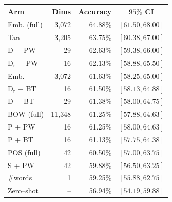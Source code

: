 \begin{tabular}{@{}l r r c@{}}
\toprule
Arm & Dims & Accuracy & $95\%$ CI \\
\midrule
Emb. (full)            & 3{,}072  & 64.88\% & $[61.50, 68.00]$ \\
Tan                    & 3{,}205  & 63.75\% & $[60.38, 67.00]$ \\
D + PW                 & 29       & 62.63\% & $[59.38, 66.00]$ \\
D$_{\mathrm{r}}$ + PW  & 16       & 62.13\% & $[58.88, 65.50]$ \\
Emb.                   & 3{,}072  & 61.63\% & $[58.25, 65.00]$ \\
D$_{\mathrm{r}}$ + BT  & 16       & 61.50\% & $[58.13, 64.88]$ \\
D + BT                 & 29       & 61.38\% & $[58.00, 64.75]$ \\
BOW (full)             & 11{,}348 & 61.25\% & $[57.88, 64.63]$ \\
P + PW                 & 16       & 61.25\% & $[58.00, 64.63]$ \\
P + BT                 & 16       & 61.13\% & $[57.75, 64.38]$ \\
POS (full)             & 42       & 60.50\% & $[57.00, 63.75]$ \\
S + PW                 & 42       & 59.88\% & $[56.50, 63.25]$ \\
\#words                & 1        & 59.25\% & $[55.88, 62.75]$ \\
Zero--shot             & --       & 56.94\% & $[54.19, 59.88]$ \\
\bottomrule
\end{tabular}
